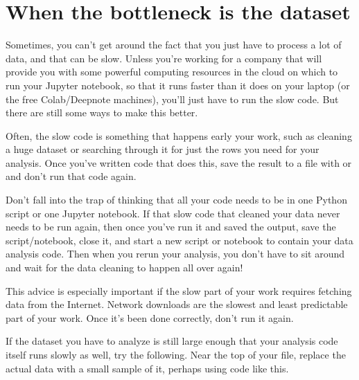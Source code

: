 \documentclass[letterpaper,10pt,english]{sphinxmanual}
\begin{document}
\section{When the bottleneck is the dataset}
\label{\detokenize{chapter-11-processing-rows:when-the-bottleneck-is-the-dataset}}
Sometimes, you can’t get around the fact that you just have to process a lot of data, and that can be slow.  Unless you’re working for a company that will provide you with some powerful computing resources in the cloud on which to run your Jupyter notebook, so that it runs faster than it does on your laptop (or the free Colab/Deepnote machines), you’ll just have to run the slow code.  But there are still some ways to make this better.

  Often, the slow code is something that happens early your work, such as cleaning a huge dataset or searching through it for just the rows you need for your analysis.  Once you’ve written code that does this, save the result to a file with  or  and don’t run that code again.

Don’t fall into the trap of thinking that all your code needs to be in one Python script or one Jupyter notebook.  If that slow code that cleaned your data never needs to be run again, then once you’ve run it and saved the output, save the script/notebook, close it, and start a new script or notebook to contain your data analysis code.  Then when you re\sphinxhyphen{}run your analysis, you don’t have to sit around and wait for the data cleaning to happen all over again!

This advice is especially important if the slow part of your work requires fetching data from the Internet.  Network downloads are the slowest and least predictable part of your work.  Once it’s been done correctly, don’t run it again.

  If the dataset you have to analyze is still large enough that your analysis code itself runs slowly as well, try the following.  Near the top of your file, replace the actual data with a small sample of it, perhaps using code like this.

\begin{sphinxVerbatim}[commandchars=\\\{\}]
    
\end{sphinxVerbatim}
\end{document}
